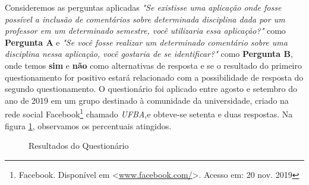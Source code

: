 \documentclass[12pt, a4paper]{report}
\begin{document}
Consideremos as perguntas aplicadas \textit{"Se existisse uma aplicação onde fosse possível a inclusão de comentários sobre determinada disciplina dada por um professor em um determinado semestre, você utilizaria essa aplicação?"} como \textbf{Pergunta A} e \textit{ 
"Se você fosse realizar um determinado comentário sobre uma disciplina nessa aplicação, você gostaria de se identificar?"} como \textbf{Pergunta B}, onde temos \textbf{sim} e \textbf{não} como alternativas de resposta e se o resultado do primeiro  questionamento for positivo estará relacionado com a possibilidade de resposta do segundo questionamento. O questionário foi aplicado entre agosto e setembro do ano de 2019 em um grupo destinado à comunidade da universidade, criado na rede social Facebook\footnote{Facebook. Disponível em <\url{www.facebook.com/}>. Acesso em: 20 nov. 2019} chamado \textit{UFBA},e obteve-se setenta e duas respostas. Na figura \ref{fig:questionario}, observamos os percentuais atingidos.

\begin{figure}[ht!]
\centering
{}\results
{}
\qquad

\results
{}
\caption{Resultados do Questionário}
\label{fig:questionario}
\end{figure}
\end{document}
